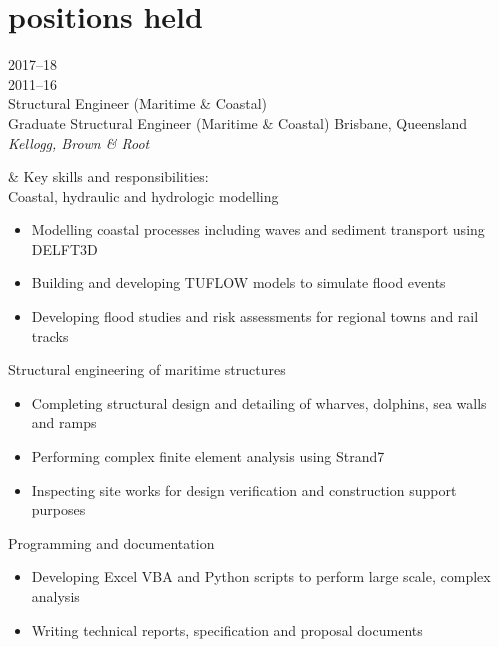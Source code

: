 \documentclass[print]{friggeri}
\begin{document}

\section{positions held}

\begin{entrylist}

\entry%
{2017--18\\
2011--16}
{\vspace*{-4.6ex}\\Structural Engineer (Maritime \& Coastal)\\
Graduate Structural Engineer (Maritime \& Coastal)}%
{Brisbane, Queensland}
{\emph{Kellogg, Brown \& Root}}

& Key skills and responsibilities:\\

\entrybulletsindented%
{}
{Coastal, hydraulic and hydrologic modelling}
{}
{\begin{itemize}
\item Modelling coastal processes including waves and sediment transport using DELFT3D
\item Building and developing TUFLOW models to simulate flood events
\item Developing flood studies and risk assessments for regional towns and rail tracks
\end{itemize}
}

\entrybulletsindented%
{}
{Structural engineering of maritime structures}
{}
{\begin{itemize}
  \item Completing structural design and detailing of wharves, dolphins, sea walls and ramps
  \item Performing complex finite element analysis using Strand7
  \item Inspecting site works for design verification and construction support purposes
\end{itemize}
}

\entrybulletsindented%
{}
{Programming and documentation}
{}
{\begin{itemize}
\item Developing Excel VBA and Python scripts to perform large scale, complex analysis
\item Writing technical reports, specification and proposal documents

\end{itemize}}



\end{entrylist}
\end{document}
